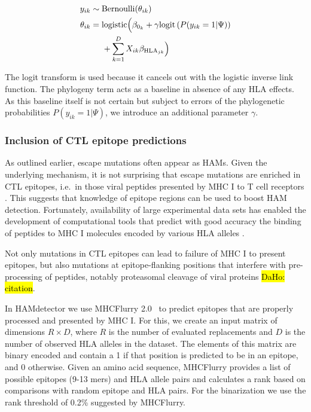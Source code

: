\documentclass{bioinfo}
\begin{document}
\begin{methods}
\begin{equation}
\begin{aligned}
  y_{ik}  & \sim \text{Bernoulli}(\theta_{ik}) \\
  \theta_{ik}  & =  \text{logistic}\Bigl(\beta_{0_{k}} + \gamma \text{logit}\left(P(y_{ik}=1|\Psi)\right) \\
  &\;\;\;\;\; + \sum_{k=1}^{D}X_{ik}\beta_{\text{HLA}_{jk}}\Bigr)
  \label{eq:phylogeny}
\end{aligned}
\end{equation}


The logit transform is used because it cancels out with the logistic inverse link function. The phylogeny term acts as a baseline in absence of any HLA effects. As this baseline itself is not certain but subject to errors of the phylogenetic probabilities $P(y_{ik}=1|\Psi)$, we introduce an additional parameter $\gamma$.

\subsubsection{Inclusion of CTL epitope predictions}


As outlined earlier, escape mutations often appear as HAMs. Given the underlying mechanism, it is not surprising that escape mutations are enriched in CTL epitopes, i.e.\ in those viral peptides presented by MHC I to T cell receptors \citep{Bronke2013}. This suggests that knowledge of epitope regions can be used to boost HAM detection. Fortunately, availability of large experimental data sets \citep{Vita2019} has enabled the development of computational tools that predict with good accuracy the binding of peptides to MHC I molecules encoded by various HLA alleles \citep{Mei2020}. 

Not only mutations in CTL epitopes can lead to failure of MHC I to present epitopes, but also mutations at epitope-flanking positions that interfere with pre-processing of peptides, notably proteasomal cleavage of viral proteins \hl{DaHo: citation}.

In HAMdetector we use MHCFlurry 2.0~\citep{ODonnell2020} to predict epitopes that are properly processed and presented by MHC I. For this, we create an input matrix of dimensions $R\times D$, where $R$ is the number of evaluated replacements and $D$ is the number of observed HLA alleles in the dataset. The elements of this matrix are binary encoded and contain a 1 if that position is predicted to be in an epitope, and 0 otherwise. Given an amino acid sequence, MHCFlurry provides a list of possible epitopes (9-13 mers) and HLA allele pairs and calculates a rank based on comparisons with random epitope and HLA pairs. For the binarization we use the rank threshold of 0.2\% suggested by MHCFlurry.


\end{methods}
\end{document}
